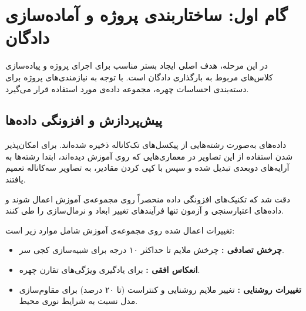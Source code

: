 \section{گام اول: ساختاربندی پروژه و آماده‌سازی دادگان}

در این مرحله، هدف اصلی ایجاد بستر مناسب برای اجرای پروژه و پیاده‌سازی کلاس‌های مربوط به بارگذاری دادگان  است. با توجه به نیازمندی‌های پروژه برای دسته‌بندی احساسات چهره، مجموعه داده‌ی  مورد استفاده قرار می‌گیرد.

\begin{stepbox}
\end{stepbox}

\subsection{پیش‌پردازش و افزونگی داده‌ها }

داده‌های  به‌صورت رشته‌هایی از پیکسل‌های تک‌کاناله  ذخیره شده‌اند. برای امکان‌پذیر شدن استفاده از این تصاویر در معماری‌هایی که روی  آموزش دیده‌اند، ابتدا رشته‌ها به آرایه‌های دوبعدی تبدیل شده و سپس با کپی کردن مقادیر، به تصاویر سه‌کاناله  تعمیم یافتند.

\begin{tipbox}
دقت شد که تکنیک‌های افزونگی داده  منحصراً روی مجموعه‌ی آموزش  اعمال شوند و داده‌های اعتبارسنجی  و آزمون  تنها فرآیندهای تغییر ابعاد و نرمال‌سازی را طی کنند.
\end{tipbox}

تغییرات اعمال شده روی مجموعه‌ی آموزش شامل موارد زیر است:
\begin{itemize}
    \item \textbf{چرخش تصادفی :} چرخش ملایم تا حداکثر ۱۰ درجه برای شبیه‌سازی کجی سر.
    \item \textbf{انعکاس افقی :} برای یادگیری ویژگی‌های تقارن چهره.
    \item \textbf{تغییرات روشنایی :} تغییر ملایم روشنایی و کنتراست (تا ۲۰ درصد) برای مقاوم‌سازی مدل نسبت به شرایط نوری محیط.
\end{itemize}

